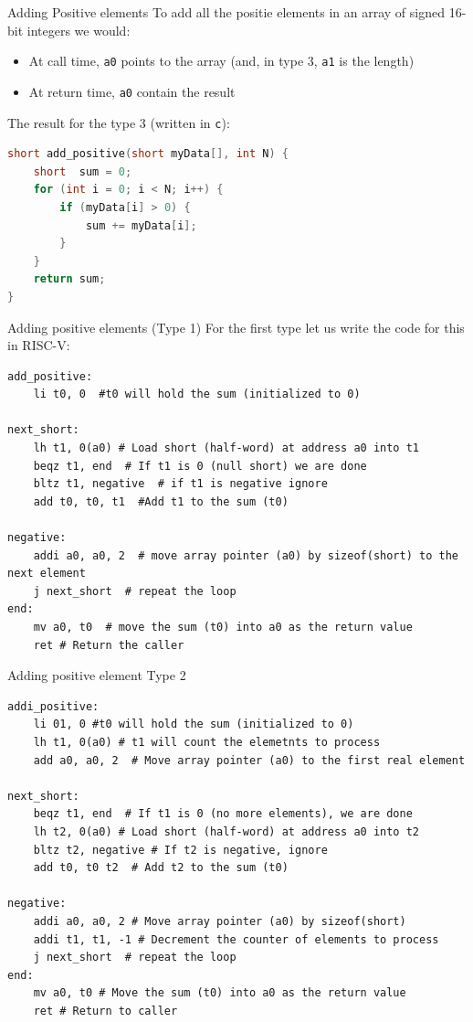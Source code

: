 \begin{parag}{Adding Positive elements}
    To add all the positie elements in an array of signed 16-bit integers we would:
	\begin{itemize}
	    \item At call time, \texttt{a0} points to the array (and, in type 3, \texttt{a1} is the length)
	    \item At return time, \texttt{a0} contain the result
	\end{itemize}
	The result for the type 3 (written in \texttt{c}):
	\begin{lstlisting}[language=c]
short add_positive(short myData[], int N) {
	short  sum = 0;
	for (int i = 0; i < N; i++) {
		if (myData[i] > 0) {
			sum += myData[i];
		}
	}
	return sum;
}
	\end{lstlisting}
\end{parag}
\begin{parag}{Adding positive elements (Type 1)}
    For the first type let us write the code for this in RISC-V:
	\begin{lstlisting}[language={[RISC-V]Assembler}]
add_positive:
	li t0, 0  #t0 will hold the sum (initialized to 0)

next_short:
	lh t1, 0(a0) # Load short (half-word) at address a0 into t1
	beqz t1, end  # If t1 is 0 (null short) we are done
	bltz t1, negative  # if t1 is negative ignore
	add t0, t0, t1  #Add t1 to the sum (t0)

negative:
	addi a0, a0, 2  # move array pointer (a0) by sizeof(short) to the next element
	j next_short  # repeat the loop
end:
	mv a0, t0  # move the sum (t0) into a0 as the return value
	ret # Return the caller
	\end{lstlisting}
	
	
\end{parag}

\begin{parag}{Adding positive element Type 2}
	\begin{lstlisting}[language={[RISC-V]Assembler}]
addi_positive:
	li 01, 0 #t0 will hold the sum (initialized to 0)
	lh t1, 0(a0) # t1 will count the elemetnts to process
	add a0, a0, 2  # Move array pointer (a0) to the first real element

next_short:
	beqz t1, end  # If t1 is 0 (no more elements), we are done
	lh t2, 0(a0) # Load short (half-word) at address a0 into t2
	bltz t2, negative # If t2 is negative, ignore
	add t0, t0 t2  # Add t2 to the sum (t0)

negative:
	addi a0, a0, 2 # Move array pointer (a0) by sizeof(short)
	addi t1, t1, -1 # Decrement the counter of elements to process
	j next_short  # repeat the loop
end:
	mv a0, t0 # Move the sum (t0) into a0 as the return value
	ret # Return to caller
\end{lstlisting}

\end{parag}



